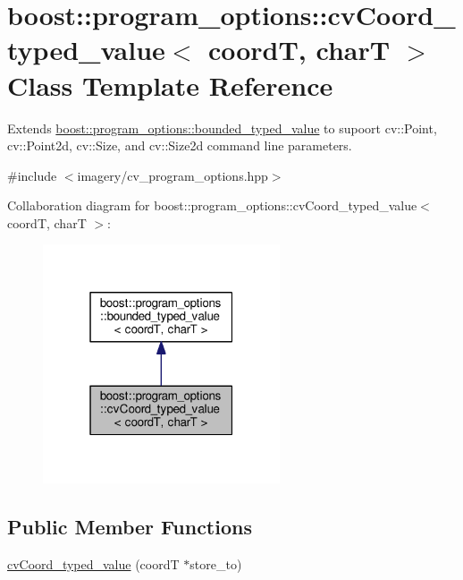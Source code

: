 \hypertarget{structboost_1_1program__options_1_1cv_coord__typed__value}{}\section{boost\+:\+:program\+\_\+options\+:\+:cv\+Coord\+\_\+typed\+\_\+value$<$ coordT, charT $>$ Class Template Reference}
\label{structboost_1_1program__options_1_1cv_coord__typed__value}


Extends \hyperlink{classboost_1_1program__options_1_1bounded__typed__value}{boost\+::program\+\_\+options\+::bounded\+\_\+typed\+\_\+value} to supoort cv\+::\+Point, cv\+::\+Point2d, cv\+::\+Size, and cv\+::\+Size2d command line parameters.  




{\ttfamily \#include $<$imagery/cv\+\_\+program\+\_\+options.\+hpp$>$}



Collaboration diagram for boost\+:\+:program\+\_\+options\+:\+:cv\+Coord\+\_\+typed\+\_\+value$<$ coordT, charT $>$\+:
\nopagebreak
\begin{figure}[H]
\begin{center}
\leavevmode
\includegraphics[width=199pt]{structboost_1_1program__options_1_1cv_coord__typed__value__coll__graph}
\end{center}
\end{figure}
\subsection*{Public Member Functions}
\begin{DoxyCompactItemize}
\item 
\hyperlink{structboost_1_1program__options_1_1cv_coord__typed__value_ac9bb0939835feed5c4e750fdc8029c9a}{cv\+Coord\+\_\+typed\+\_\+value} (coordT $\ast$store\+\_\+to)
\end{DoxyCompactItemize}



